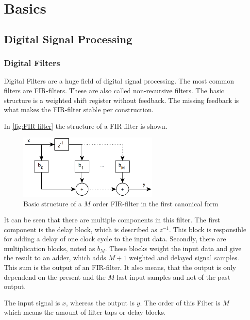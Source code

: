 \section{Basics}

\subsection{Digital Signal Processing}

\subsubsection{Digital Filters}


Digital Filters are a huge field of digital signal processing. The most common filters are \ac{FIR}-filters.
These are also called \frqq non-recursive filters\flqq .
The basic structure is a weighted shift register without feedback. The missing feedback is what makes
the \ac{FIR}-filter stable per construction.

In \autoref{fig:FIR-filter} the structure of a \ac{FIR}-filter is shown.

\begin{figure}[!h]
    \centering
    \includegraphics[width=7cm]{img/fir.png}
    \caption{Basic structure of a $M$ order \ac{FIR}-filter in the first canonical form \cite{meyer_signalverarbeitung}}
    \label{fig:FIR-filter}
\end{figure}

It can be seen that there are multiple components in this filter. The first component is the delay block,
which is described as $z^{-1}$. This block is responsible for adding a delay of one clock cycle to the input data.
Secondly, there are multiplication blocks, noted as $b_M$. These blocks weight the input data and give the
result to an adder, which adds $M+1$ weighted and delayed signal samples. This sum is the output of an
\ac{FIR}-filter. It also means, that the output is only dependend on the present and the $M$ last input samples
and not of the past output.

The input signal is $x$, whereas the output is $y$. The order of this Filter is $M$ which means the amount of
filter taps or delay blocks.


